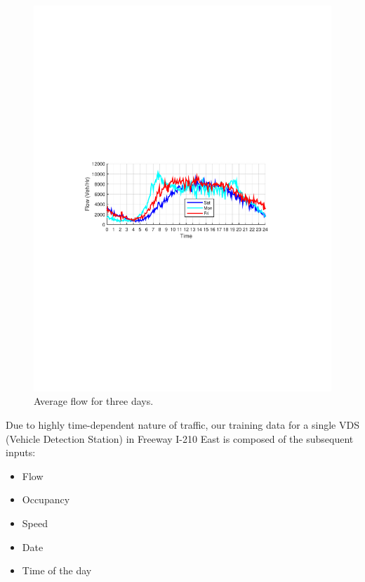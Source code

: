 \documentclass[twocolumn,10pt]{asme2e}
\begin{document}
\begin{figure}[h]
	\centering
	\includegraphics[width=0.7\linewidth]{./Figures/flw1}
	\caption{Average flow for three days.}
	\label{fig:flw1}
\end{figure} 


Due to highly time-dependent nature of traffic, our training data for a single VDS (Vehicle Detection Station) in Freeway I-210 East is composed of the subsequent inputs:
\begin{itemize}
\item Flow
\item Occupancy
\item Speed
\item Date
\item Time of the day
\end{itemize}
 
\end{document}
